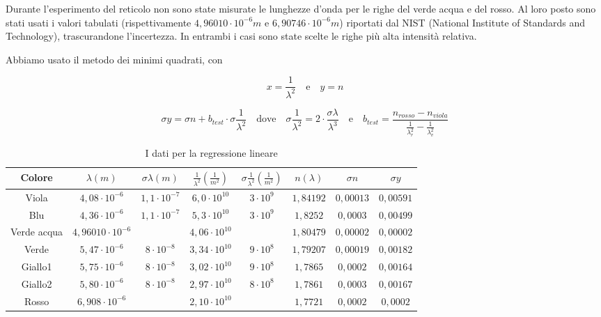 \documentclass{article}
\begin{document}
Durante l'esperimento del reticolo non sono state misurate le lunghezze d'onda per le righe del verde acqua e del rosso. Al loro posto sono stati usati i valori tabulati (rispettivamente $4,96010 \cdot 10^{-6} m$ e $6,90746 \cdot 10^{-6} m$) riportati dal NIST (National Institute of Standards and Technology), trascurandone l'incertezza. In entrambi i casi sono state scelte le righe più alta intensità relativa. 

Abbiamo usato il metodo dei minimi quadrati, con 

\[x=\frac{1}{\lambda ^2} \quad \textrm{e} \quad y=n\]

\[\sigma y = \sigma n + b_{test} \cdot \sigma \frac{1}{\lambda ^2} \quad \textrm{dove} \quad \sigma \frac{1}{\lambda ^2}=2 \cdot \frac{\sigma \lambda}{\lambda ^3} \quad \textrm{e} \quad  b_{test} = \frac{n_{rosso}-n_{viola}}{\frac{1}{\lambda _{r}^2}-\frac{1}{\lambda _{v}^2}}\]

\begin{table}[h!]
\centering
\begin{tabular}{ | c | c | c | c | c | c | c | c | }
  \hline
  Colore & $\lambda (m)$ & $\sigma \lambda (m)$ &  $\frac{1}{\lambda^2} (\frac{1}{m^2})$ & $\sigma \frac{1}{\lambda^2} (\frac{1}{m^2})$ & $n(\lambda)$ & $\sigma n$ & $\sigma y$\\
  \hline
  Viola & $4,08 \cdot 10^{-6}$ & $1,1 \cdot 10^{-7}$ & $6,0 \cdot 10^{10}$ & $3 \cdot 10^9$ & $1,84192$ & $0,00013$ & $0,00591$\\
  Blu & $4,36 \cdot 10^{-6}$ & $1,1 \cdot 10^{-7}$ & $5,3 \cdot 10^{10}$ & $3 \cdot 10^9$ & $1,8252$ & $0,0003$ & $0,00499$\\
  Verde acqua & $4,96010 \cdot 10^{-6}$ && $4,06 \cdot 10^{10}$ && $1,80479$ & $0,00002$ & $0,00002$\\
  Verde & $5,47 \cdot 10^{-6}$ & $8 \cdot 10^{-8}$ & $3,34 \cdot 10^{10}$ & $9 \cdot 10^8$ & $1,79207$ & $0,00019$ & $0,00182$\\
  Giallo1 & $5,75 \cdot 10^{-6}$ & $8 \cdot 10^{-8}$ & $3,02 \cdot 10^{10}$ & $9 \cdot 10^8$ & $1,7865$ & $0,0002$ & $0,00164$\\
  Giallo2 & $5,80 \cdot 10^{-6}$ & $8 \cdot 10^{-8}$ & $2,97 \cdot 10^{10}$ & $8 \cdot 10^8$ & $1,7861$ & $0,0003$ & $0,00167$\\
  Rosso & $6,908 \cdot 10^{-6}$ && $2,10 \cdot 10^{10}$ && $1,7721$ & $0,0002$ & $0,0002$\\
  \hline
\end{tabular}
  \caption{I dati per la regressione lineare}
  \label{table:1}
\end{table}
\end{document}
